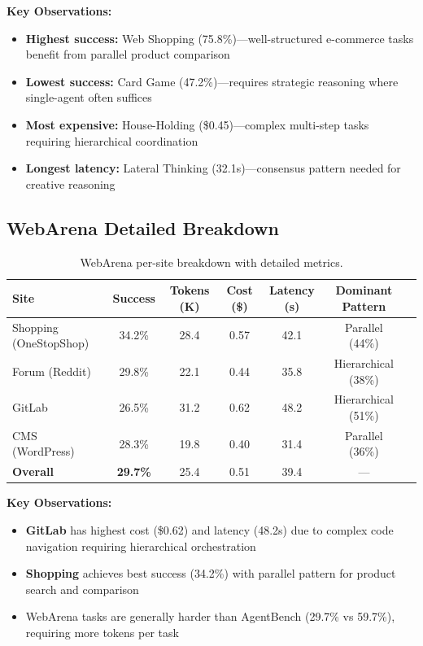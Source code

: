 \documentclass{article}
\theoremstyle{plain}
\theoremstyle{definition}
\theoremstyle{remark}
\begin{document}
\textbf{Key Observations:}
\begin{itemize}[nosep,leftmargin=*]
\item \textbf{Highest success:} Web Shopping (75.8\%)---well-structured e-commerce tasks benefit from parallel product comparison
\item \textbf{Lowest success:} Card Game (47.2\%)---requires strategic reasoning where single-agent often suffices
\item \textbf{Most expensive:} House-Holding (\$0.45)---complex multi-step tasks requiring hierarchical coordination
\item \textbf{Longest latency:} Lateral Thinking (32.1s)---consensus pattern needed for creative reasoning
\end{itemize}

\subsection{WebArena Detailed Breakdown}

\begin{table}[h]
\centering
\caption{WebArena per-site breakdown with detailed metrics.}
\label{tab:webarena-detailed}
\small
\begin{tabular}{lcccccc}
\toprule
\textbf{Site} & \textbf{Success} & \textbf{Tokens (K)} & \textbf{Cost (\$)} & \textbf{Latency (s)} & \textbf{Dominant Pattern} \\
\midrule
Shopping (OneStopShop) & 34.2\% & 28.4 & 0.57 & 42.1 & Parallel (44\%) \\
Forum (Reddit) & 29.8\% & 22.1 & 0.44 & 35.8 & Hierarchical (38\%) \\
GitLab & 26.5\% & 31.2 & 0.62 & 48.2 & Hierarchical (51\%) \\
CMS (WordPress) & 28.3\% & 19.8 & 0.40 & 31.4 & Parallel (36\%) \\
\midrule
\textbf{Overall} & \textbf{29.7\%} & 25.4 & 0.51 & 39.4 & --- \\
\bottomrule
\end{tabular}
\end{table}

\textbf{Key Observations:}
\begin{itemize}[nosep,leftmargin=*]
\item \textbf{GitLab} has highest cost (\$0.62) and latency (48.2s) due to complex code navigation requiring hierarchical orchestration
\item \textbf{Shopping} achieves best success (34.2\%) with parallel pattern for product search and comparison
\item WebArena tasks are generally harder than AgentBench (29.7\% vs 59.7\%), requiring more tokens per task
\end{itemize}
\end{document}
